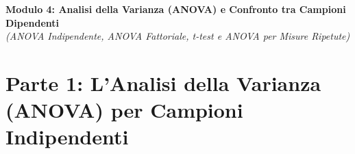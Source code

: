 \documentclass[12pt, a4paper]{article}
\begin{document}
\begin{center}
    \Large\textbf{Modulo 4: Analisi della Varianza (ANOVA) e Confronto tra Campioni Dipendenti} \\
    \vspace{0.5cm}
    \large\textit{(ANOVA Indipendente, ANOVA Fattoriale, t-test e ANOVA per Misure Ripetute)}
\end{center}

\section*{Parte 1: L'Analisi della Varianza (ANOVA) per Campioni Indipendenti}

\end{document}
